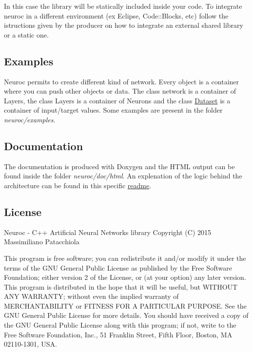 In this case the library will be statically included inside your code. To integrate neuroc in a different environment (ex Eclipse, Code\-::\-Blocks, etc) follow the istructions given by the producer on how to integrate an external shared library or a static one.

\subsection*{Examples }

Neuroc permits to create different kind of network. Every object is a container where you can push other objects or data. The class network is a container of Layers, the class Layers is a container of Neurons and the class \hyperlink{class_dataset}{Dataset} is a container of input/target values. Some examples are present in the folder {\itshape neuroc/examples}.

\subsection*{Documentation }

The documentation is produced with Doxygen and the H\-T\-M\-L output can be found inside the folder {\itshape neuroc/doc/html}. An explenation of the logic behind the architecture can be found in this specific \hyperlink{md__a_r_c_h_i_t_e_c_t_u_r_e}{readme}.

\subsection*{License }

Neuroc -\/ C++ Artificial Neural Networks library Copyright (C) 2015 Massimiliano Patacchiola

This program is free software; you can redistribute it and/or modify it under the terms of the G\-N\-U General Public License as published by the Free Software Foundation; either version 2 of the License, or (at your option) any later version. This program is distributed in the hope that it will be useful, but W\-I\-T\-H\-O\-U\-T A\-N\-Y W\-A\-R\-R\-A\-N\-T\-Y; without even the implied warranty of M\-E\-R\-C\-H\-A\-N\-T\-A\-B\-I\-L\-I\-T\-Y or F\-I\-T\-N\-E\-S\-S F\-O\-R A P\-A\-R\-T\-I\-C\-U\-L\-A\-R P\-U\-R\-P\-O\-S\-E. See the G\-N\-U General Public License for more details. You should have received a copy of the G\-N\-U General Public License along with this program; if not, write to the Free Software Foundation, Inc., 51 Franklin Street, Fifth Floor, Boston, M\-A 02110-\/1301, U\-S\-A. 